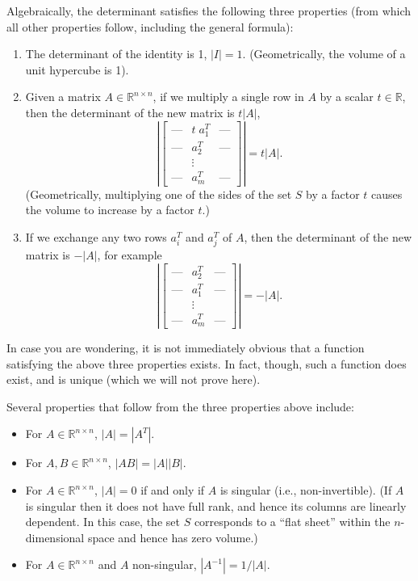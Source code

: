 \documentclass[12pt]{article}
\begin{document}
Algebraically, the determinant satisfies the following three properties (from which all other properties follow, including the
general formula):
\begin{enumerate}
\item The determinant of the identity is 1, $|I| = 1$.  (Geometrically, the volume of a unit hypercube is 1).   
\item Given a matrix $A \in \mathbb{R}^{n \times n}$, if we multiply a
  single row in $A$ by a scalar $t \in \mathbb{R}$, then the
  determinant of the new matrix is $t |A|$,
\[\left | \left [ \begin{array}{ccc} \mbox{---} & t \; a^T_1 & 
  \mbox{---} \\   \mbox{---} & a^T_2 &  \mbox{---} \\ & \vdots & \\
  \mbox{---} & a^T_m  &  \mbox{---} \end{array} \right ] \right |= t
  |A|. \] 
  (Geometrically, multiplying one of the sides of the set $S$ by a factor $t$
  causes the volume to increase by a factor $t$.)
\item If we exchange any two rows $a_i^T$ and $a_j^T$ of $A$, then the
  determinant of the new matrix is $-|A|$, for example
\[\left | \left [ \begin{array}{ccc} \mbox{---} & a^T_2 & 
  \mbox{---} \\   \mbox{---} & a^T_1 &  \mbox{---} \\ & \vdots & \\
  \mbox{---} & a^T_m  &  \mbox{---} \end{array} \right ] \right |=
  -|A|. \]  
\end{enumerate}
In case you are wondering, it is not immediately obvious that a function satisfying
the above three properties exists.  In fact, though, such a function does exist, 
and is unique (which we will not prove here).  

Several properties that follow from the three properties above include:
\begin{itemize}
\item For $A \in \mathbb{R}^{n \times n}$, $|A| = |A^T|$.
\item For $A, B \in \mathbb{R}^{n \times n}$, $|AB| = |A||B|$.
\item For $A \in \mathbb{R}^{n \times n}$, $|A| = 0$ if and only if
  $A$ is singular (i.e., non-invertible).
  (If $A$ is singular then it does not have full rank, and hence
  its columns are linearly dependent.  In this case, the set $S$ corresponds to a
  ``flat sheet'' within the $n$-dimensional space and hence has zero volume.)
\item For $A \in \mathbb{R}^{n \times n}$ and $A$ non-singular,
  $|A^{-1}| = 1/|A|$.
\end{itemize}
\end{document}

